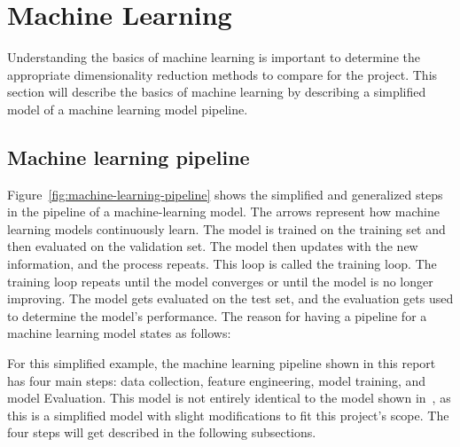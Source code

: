 
\section{Machine Learning}\label{sec:theory-machine-learning}
Understanding the basics of machine learning is important to determine the appropriate dimensionality reduction methods to compare for the project. This section will describe the basics of machine learning by describing a simplified model of a machine learning model pipeline.


\subsection{Machine learning pipeline}\label{subsec:machine-learning-pipeline}
Figure~\ref{fig:machine-learning-pipeline} shows the simplified and generalized steps in the pipeline of a machine-learning model. The arrows represent how machine learning models continuously learn. The model is trained on the training set and then evaluated on the validation set. The model then updates with the new information, and the process repeats. This loop is called the training loop. The training loop repeats until the model converges or until the model is no longer improving. The model gets evaluated on the test set, and the evaluation gets used to determine the model's performance. The reason for having a pipeline for a machine learning model states as follows:


For this simplified example, the machine learning pipeline shown in this report has four main steps: data collection, feature engineering, model training, and model Evaluation. This model is not entirely identical to the model shown in~\cite{machine-learning-pipeline-architecture}, as this is a simplified model with slight modifications to fit this project's scope. The four steps will get described in the following subsections.


